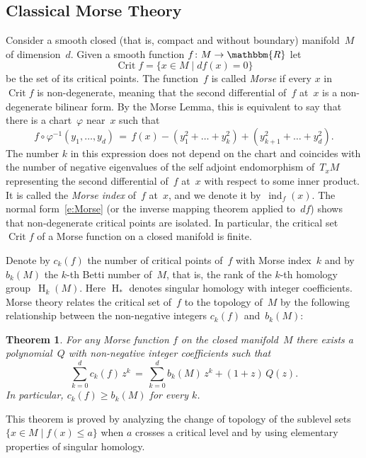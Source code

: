 \documentclass[12pt,twoside]{amsart}
\theoremstyle{plain}
\newtheorem{theorem}{Theorem}[section]
\numberwithin{figure}{section}
\numberwithin{equation}{section}
\def\ind{\operatorname{ind}}
\def\Crit{\operatorname{Crit}}
\def\H{\operatorname{H}}
\def\RR{\mathbbm{R}}
\begin{document}
\subsection{Classical Morse Theory} \label{s:classical}
Consider a smooth closed (that is, compact and without boundary) manifold~$M$ of dimension~$d$. Given a smooth function $f \colon M \to \RR$ let 
\[
\Crit f = \{ x \in M \mid df (x) =0\}
\]
be the set of its critical points. The function~$f$ is called {\em Morse}\/ if every $x$ 
in~$\Crit f$ is non-degenerate, meaning that the second differential of~$f$ at~$x$ is a non-degenerate bilinear form. By the Morse Lemma, this is equivalent to say that there is 
a chart~$\varphi$ near~$x$ such that
%
\begin{equation} \label{e:Morse}
f \circ \varphi^{-1} (y_1, \dots, y_d) \,=\, f(x) - ( y_1^2 + \dots + y_k^2) + ( y_{k+1}^2 + \dots + y_d^2) .
\end{equation}
The number $k$ in this expression does not depend on the chart and coincides with the number of negative eigenvalues of the self adjoint endomorphism of~$T_x M$ representing the second differential of~$f$ at~$x$ with respect to some inner product. 
It is called the {\em Morse index}\/ of~$f$ at~$x$, and we denote it by~$\ind_f(x)$. 
The normal form~\eqref{e:Morse} (or the inverse mapping theorem applied to~$df$) shows that 
non-degenerate critical points are isolated. 
In particular, the critical set~$\Crit f$ of a Morse function on a closed manifold is finite.

Denote by $c_k(f)$ the number of critical points of~$f$ with Morse index~$k$ and by~$b_k(M)$ 
the $k$-th Betti number of~$M$, that is, the rank of the $k$-th homology group~$\H_k(M)$. 
Here $\H_*$ denotes singular homology with integer coefficients. 
Morse theory relates the critical set of~$f$ to the topology of~$M$ by the following relationship between the non-negative integers $c_k(f)$ and~$b_k(M)$:

\begin{theorem} \label{t:Morse}
For any Morse function $f$ on the closed manifold~$M$ there exists a polynomial~$Q$ with 
non-negative integer coefficients such that
\begin{equation}
\label{morse}
\sum_{k=0}^d c_k(f)\, z^k \,=\, \sum_{k=0}^d b_k (M)\, z^k + (1+z)\, Q(z).
\end{equation}
In particular, $c_k(f) \geqslant b_k(M)$ for every $k$.
\end{theorem}

This theorem is proved by analyzing the change of 
topology of the sublevel sets 
$\{ x \in M \mid f(x) \leqslant a\}$ when $a$ crosses a critical level 
and by using elementary properties of singular homology.
\end{document}
